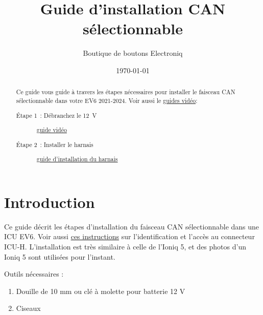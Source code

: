 \documentclass[superscriptaddress,onecolumn,floatfix]{revtex4-2}
\makeatletter
\DeclareRobustCommand{\selectlanguage}[1]{%
    \@ifundefined{alias@\string#1}
      {\ORIGselectlanguage{#1}}
      {\begingroup\edef\x{\endgroup
         \noexpand\ORIGselectlanguage{\@nameuse{alias@#1}}}\x}%
}
\makeatother
\begin{document}
\selectlanguage{fr}

\begin{abstract}
  Ce guide vous guide à travers les étapes nécessaires pour installer le faisceau CAN sélectionnable dans votre EV6 2021-2024. Voir aussi le \href{https://youtube.com/playlist?list=PLYCTmVJH4UYqnw87UZAaqMo1GrOv0cJaL}{guides vidéo}:
  \begin{description}
    \item[Étape 1 : Débranchez le 12 V] \href{https://youtu.be/ePBdyeBYKk4}{guide vidéo}
    \item[Étape 2 : Installer le harnais] \href{https://youtu.be/kVvkR4ZLFMI}{guide d'installation du harnais}
  \end{description}
\end{abstract}
\title{Guide d'installation CAN sélectionnable}
\author{Boutique de boutons Electroniq}
\date{\today}

\maketitle


\section{Introduction}
Ce guide décrit les étapes d'installation du faisceau CAN sélectionnable dans une ICU EV6. Voir aussi \href{https://github.com/dragz/explorationsincarhacking/blob/main/articles/getting_past_the_secure_gateway/getting_past_the_secure_gateway.md}{ces instructions} sur l'identification et l'accès au connecteur ICU-H. L'installation est très similaire à celle de l'Ioniq 5, et des photos d'un Ioniq 5 sont utilisées pour l'instant.

Outils nécessaires :
\begin{enumerate}
  \item Douille de 10 mm ou clé à molette pour batterie 12 V
  \item Ciseaux
\end{enumerate}
\end{document}
